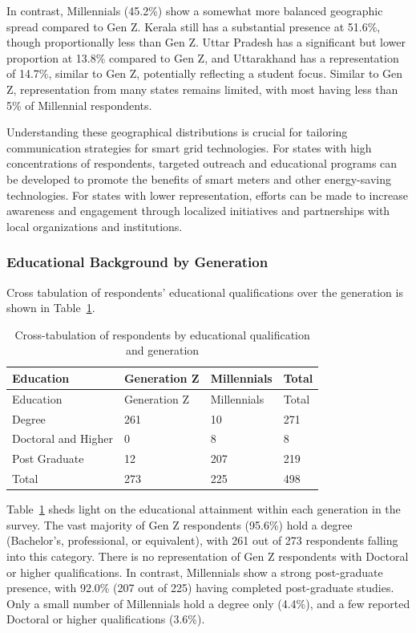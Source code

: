 \documentclass[
  letterpaper,
  DIV=11,
  numbers=noendperiod]{scrartcl}
\begin{document}
In contrast, Millennials (45.2\%) show a somewhat more balanced
geographic spread compared to Gen Z. Kerala still has a substantial
presence at 51.6\%, though proportionally less than Gen Z. Uttar Pradesh
has a significant but lower proportion at 13.8\% compared to Gen Z, and
Uttarakhand has a representation of 14.7\%, similar to Gen Z,
potentially reflecting a student focus. Similar to Gen Z, representation
from many states remains limited, with most having less than 5\% of
Millennial respondents.

Understanding these geographical distributions is crucial for tailoring
communication strategies for smart grid technologies. For states with
high concentrations of respondents, targeted outreach and educational
programs can be developed to promote the benefits of smart meters and
other energy-saving technologies. For states with lower representation,
efforts can be made to increase awareness and engagement through
localized initiatives and partnerships with local organizations and
institutions.

\subsubsection{Educational Background by
Generation}\label{educational-background-by-generation}

Cross tabulation of respondents' educational qualifications over the
generation is shown in Table~\ref{tbl-education-generation}.

\begin{longtable}[]{@{}llll@{}}
\caption{Cross-tabulation of respondents by educational qualification
and generation}\label{tbl-education-generation}\tabularnewline
\toprule\noalign{}
Education & Generation Z & Millennials & Total \\
\midrule\noalign{}
\endfirsthead
\toprule\noalign{}
Education & Generation Z & Millennials & Total \\
\midrule\noalign{}
\endhead
\bottomrule\noalign{}
\endlastfoot
Degree & 261 & 10 & 271 \\
Doctoral and Higher & 0 & 8 & 8 \\
Post Graduate & 12 & 207 & 219 \\
Total & 273 & 225 & 498 \\
\end{longtable}

Table~\ref{tbl-education-generation} sheds light on the educational
attainment within each generation in the survey. The vast majority of
Gen Z respondents (95.6\%) hold a degree (Bachelor's, professional, or
equivalent), with 261 out of 273 respondents falling into this category.
There is no representation of Gen Z respondents with Doctoral or higher
qualifications. In contrast, Millennials show a strong post-graduate
presence, with 92.0\% (207 out of 225) having completed post-graduate
studies. Only a small number of Millennials hold a degree only (4.4\%),
and a few reported Doctoral or higher qualifications (3.6\%).
\end{document}
